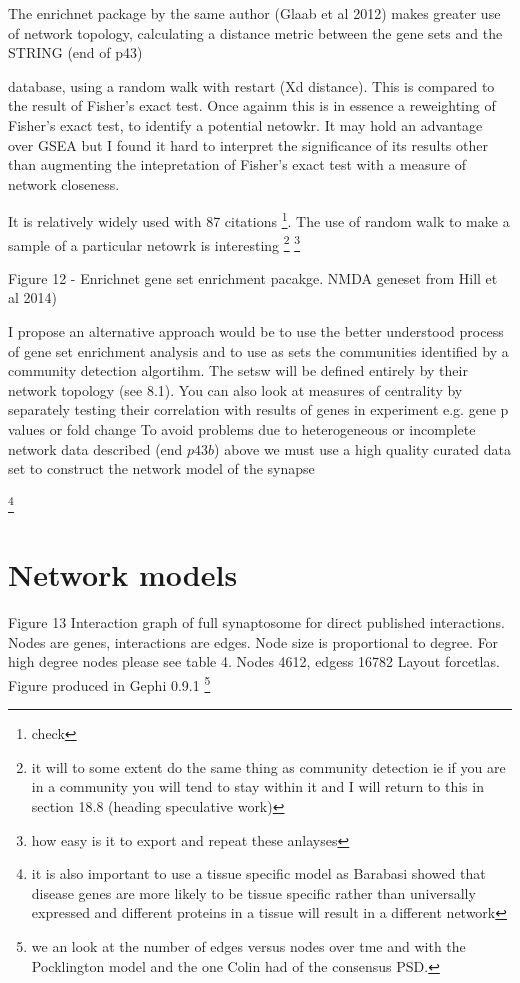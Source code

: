 The enrichnet package by the same author (Glaab et al 2012) makes greater use of network topology, calculating a distance metric between the gene sets and the STRING (end of p43)

database, using a random walk with restart (Xd distance). This is compared to the result of Fisher's exact test. Once againm this is in essence a reweighting of Fisher's exact test, to identify a potential netowkr. It may hold an advantage over GSEA but I found it hard to interpret the significance of its results other than augmenting the intepretation of Fisher's exact test with a measure of network closeness.

It is relatively widely used with 87 citations \footnote{check}. The use of random walk to make a sample of a particular netowrk is interesting \footnote {it will to some extent do the same thing as community detection ie if you are in a community you will tend to stay within it and I will return to this in section 18.8 (heading speculative work)} \footnote {how easy is it to export and repeat these anlayses}

Figure 12 - Enrichnet gene set enrichment pacakge. NMDA geneset from Hill et al 2014)

I propose an alternative approach would be to use the better understood process of gene set enrichment analysis and to use as sets the communities identified by a community detection algortihm. The setsw will be defined entirely by their network topology (see 8.1).
 You can also look at measures of centrality by separately testing their correlation with results of genes in experiment e.g. gene p  values or fold change
 To avoid problems due to heterogeneous or incomplete network data described (end $p 43b$) above we must use a high quality curated data set to construct the network model of the synapse 

\footnote{it is also important to use a tissue specific model as Barabasi showed that disease genes are more likely to be tissue specific rather than universally expressed and different proteins in a tissue will result in a different network}

\section{Network models}

Figure 13 Interaction graph of full synaptosome for direct published interactions. Nodes are genes, interactions are edges. Node size is proportional to degree. For high degree nodes please see table 4. Nodes 4612, edgess 16782 Layout forcetlas. Figure produced in Gephi 0.9.1 \footnote{we an look at the number of edges versus nodes over tme and with the Pocklington model and the one Colin had of the consensus PSD.}

